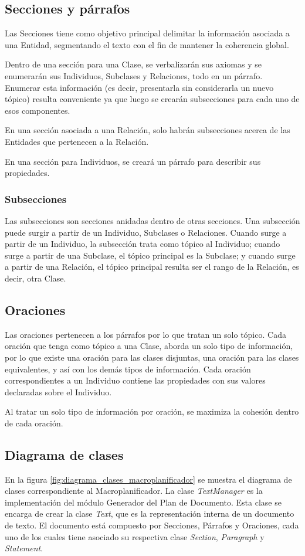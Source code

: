 \subsection{Secciones y párrafos}
Las Secciones tiene como objetivo principal delimitar la información asociada a una Entidad, segmentando el texto con el fin de mantener la coherencia global.

Dentro de una sección para una Clase, se verbalizarán sus axiomas y se enumerarán sus Individuos, Subclases y Relaciones, todo en un párrafo. Enumerar esta información (es decir, presentarla sin considerarla un nuevo tópico) resulta conveniente ya que luego se crearán subsecciones para cada uno de esos componentes.

En una sección asociada a una Relación, solo habrán subsecciones acerca de las Entidades que pertenecen a la Relación.

En una sección para Individuos, se creará un párrafo para describir sus propiedades.

\subsubsection{Subsecciones}
Las subsecciones son secciones anidadas dentro de otras secciones. Una subsección puede surgir a partir de un Individuo, Subclases o Relaciones. Cuando surge a partir de un Individuo, la subsección trata como tópico al Individuo; cuando surge a partir de una Subclase, el tópico principal es la Subclase; y cuando surge a partir de una Relación, el tópico principal resulta ser el rango de la Relación, es decir, otra Clase.

\subsection{Oraciones}
Las oraciones pertenecen a los párrafos por lo que tratan un solo tópico. Cada oración que tenga como tópico a una Clase,  aborda un solo tipo de información, por lo que existe una oración para las clases disjuntas, una oración para las clases equivalentes, y así con los demás tipos de información. Cada oración correspondientes a un Individuo contiene las propiedades con sus valores declaradas sobre el Individuo.

Al tratar un solo tipo de información por oración, se maximiza la cohesión dentro de cada oración.


\subsection{Diagrama de clases}
En la figura \ref{fig:diagrama_clases_macroplanificador} se muestra el diagrama de clases correspondiente al Macroplanificador. La clase \emph{TextManager} es la implementación del módulo Generador del Plan de Documento. Esta clase se encarga de crear la clase \emph{Text}, que es la representación interna de un documento de texto. El documento está compuesto por Secciones, Párrafos y Oraciones, cada uno de los cuales tiene asociado su respectiva clase \emph{Section}, \emph{Paragraph} y \emph{Statement}.

